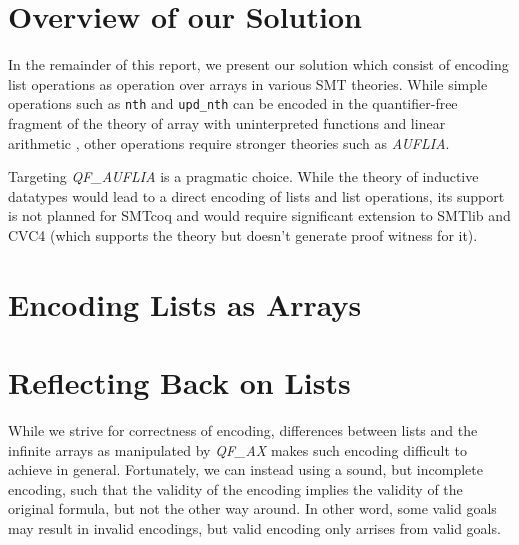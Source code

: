 \documentclass[10pt]{article}
\begin{document}
\section{Overview of our Solution}

In the remainder of this report, we present our solution which consist of encoding list operations as operation over arrays in various SMT theories. While simple operations such as \lstinline|nth| and \lstinline|upd_nth| can be encoded in the quantifier-free fragment of the theory of array with uninterpreted functions and linear arithmetic , other operations require stronger theories such as \emph{AUFLIA}. 

Targeting \emph{QF_AUFLIA} is a pragmatic choice. While the theory of inductive datatypes would lead to a direct encoding of lists and list operations, its support is not planned for SMTcoq and would require significant extension to SMTlib and CVC4 (which supports the theory but doesn't generate proof witness for it). 


\section{Encoding Lists as Arrays}





\section{Reflecting Back on Lists}
While we strive for correctness of encoding, differences between lists
and the infinite arrays as manipulated by \emph{QF\_AX} makes such encoding difficult to achieve in general. 
Fortunately, we can instead using a sound, but incomplete encoding, such that the validity 
of the encoding implies the validity of the original formula, but not the other way around.
In other word, some valid goals may result in invalid encodings, but valid encoding only arrises from valid goals.



\end{document}

